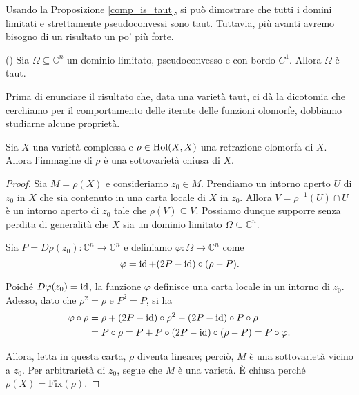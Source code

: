 Usando la Proposizione \ref{comp_is_taut}, si può dimostrare che tutti i domini limitati e strettamente pseudoconvessi sono taut. Tuttavia, più avanti avremo bisogno di un risultato un po' più forte.

\begin{prop} \label{psdcvx_is_taut}
    (\cite[Proposition 2]{KR}) Sia $\Omega\subseteq\mathbb{C}^n$ un dominio limitato, pseudoconvesso e con bordo $C^1$. Allora $\Omega$ è taut.
\end{prop}

Prima di enunciare il risultato che, data una varietà taut, ci dà la dicotomia che cerchiamo per il comportamento delle iterate delle funzioni olomorfe, dobbiamo studiarne alcune proprietà.

\begin{lm}
    Sia $X$ una varietà complessa e $\rho\in\textnormal{Hol}(X,X)$ una retrazione olomorfa di $X$. Allora l'immagine di $\rho$ è una sottovarietà chiusa di $X$.
\end{lm}
\begin{proof}
    Sia $M=\rho(X)$ e consideriamo $z_0 \in M$. Prendiamo un intorno aperto $U$ di $z_0$ in $X$ che sia contenuto in una carta locale di $X$ in $z_0$. Allora $V=\rho^{-1}(U)\cap U$ è un intorno aperto di $z_0$ tale che $\rho(V) \subseteq V$. Possiamo dunque supporre senza perdita di generalità che $X$ sia un dominio limitato $\Omega\subseteq\mathbb{C}^n$.

    Sia $P=D\rho(z_0):\mathbb{C}^n \longrightarrow \mathbb{C}^n$ e definiamo $\varphi:\Omega \longrightarrow \mathbb{C}^n$ come
    $$\varphi=\operatorname{id}+(2P-\operatorname{id})\circ(\rho-P).$$

    Poiché $D\varphi(z_0)=\operatorname{id}$, la funzione $\varphi$ definisce una carta locale in un intorno di $z_0$. Adesso, dato che $\rho^2=\rho$ e $P^2=P$, si ha
    \begin{align*}
        \varphi\circ\rho&=\rho+(2P-\operatorname{id})\circ\rho^2-(2P-\operatorname{id})\circ P\circ\rho\\
        &=P\circ\rho=P+P\circ(2P-\operatorname{id})\circ(\rho-P)=P\circ\varphi.
    \end{align*}

    Allora, letta in questa carta, $\rho$ diventa lineare; perciò, $M$ è una sottovarietà vicino a $z_0$. Per arbitrarietà di $z_0$, segue che $M$ è una varietà. È chiusa perché $\rho(X)=\text{Fix}(\rho)$.
\end{proof}

